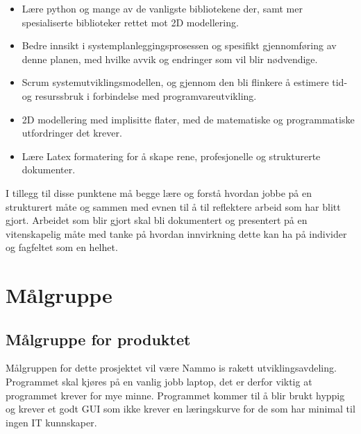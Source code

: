 \begin{itemize}

   \item    Lære python og mange av de vanligste bibliotekene der, samt mer spesialiserte biblioteker rettet mot 2D modellering.
   
   \item    Bedre innsikt i systemplanleggingsprosessen og spesifikt gjennomføring av denne planen, med hvilke avvik og endringer som vil blir nødvendige.
   
   \item    Scrum systemutviklingsmodellen, og gjennom den bli flinkere å estimere tid- og resurssbruk i forbindelse med programvareutvikling.
   
   \item    2D modellering med implisitte flater, med de matematiske og programmatiske utfordringer det krever.
   
   \item    Lære Latex formatering for å skape rene, profesjonelle og strukturerte dokumenter.
   
\end{itemize}



 

I tillegg til disse punktene må begge lære og forstå  hvordan jobbe på en strukturert måte og sammen med evnen til å til reflektere arbeid som har blitt gjort. Arbeidet som blir gjort skal bli dokumentert og presentert på en vitenskapelig måte med tanke på hvordan innvirkning dette kan ha på individer og fagfeltet som en helhet.

\section{Målgruppe}
\subsection{Målgruppe for produktet}
Målgruppen for dette prosjektet vil være Nammo is rakett utviklingsavdeling. Programmet skal kjøres på en vanlig jobb laptop, det er derfor viktig at programmet krever for mye minne.
Programmet kommer til å blir brukt hyppig og krever et godt GUI som ikke krever en læringskurve for de som har minimal til ingen IT kunnskaper.


